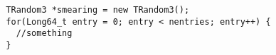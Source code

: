\begin{lstlisting}
  TRandom3 *smearing = new TRandom3();
  for(Long64_t entry = 0; entry < nentries; entry++) {
    //something
  }
\end{lstlisting}


